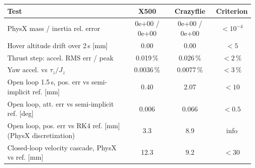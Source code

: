 \begin{tabular}{lccc}\toprule
Test & X500 & Crazyflie & Criterion\\\midrule
PhysX mass / inertia rel. error & 0e+00 / 0e+00 & 0e+00 / 0e+00 & $<10^{-4}$\\
Hover altitude drift over 2\,s [mm] & 0.00 & 0.00 & $<5$\\
Thrust step: accel. RMS err / peak & 0.019\,\% & 0.026\,\% & $<2\,\%$\\
Yaw accel. vs $\tau_z/J_z$ & 0.0036\,\% & 0.0077\,\% & $<3\,\%$\\
Open loop 1.5\,s, pos. err vs semi-implicit ref. [mm] & 0.40 & 2.07 & $<10$\\
Open loop, att. err vs semi-implicit ref. [deg] & 0.006 & 0.066 & $<0.5$\\
Open loop, pos. err vs RK4 ref. [mm] (PhysX discretization) & 3.3 & 8.9 & info\\
Closed-loop velocity cascade, PhysX vs ref. [mm] & 12.3 & 9.2 & $<30$\\
\bottomrule\end{tabular}
